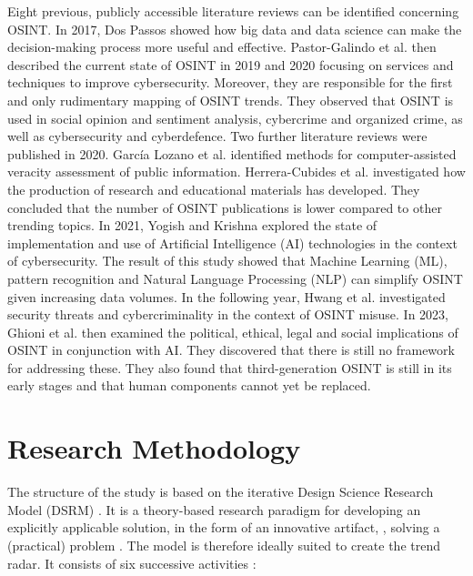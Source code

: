 \documentclass[10pt]{article}
\begin{document}
Eight previous, publicly accessible literature reviews can be identified
concerning OSINT. In 2017, Dos Passos \cite{DosPassos.2017} showed how big data and data science can
make the decision-making process more useful and effective. Pastor-Galindo et al. then described
the current state of OSINT in 2019 \cite{PastorGalindo.2019} and 2020 \cite{PastorGalindo.2020}
focusing on services and techniques to improve cybersecurity. Moreover, they are responsible
for the first and only rudimentary mapping of OSINT trends. They observed that OSINT is used in
social opinion and sentiment analysis, cybercrime and organized crime, as well as cybersecurity and cyberdefence.
Two further literature reviews were published in 2020. García Lozano et al. \cite{GarciaLozano.2020} identified
methods for computer-assisted veracity assessment of public information.
Herrera-Cubides et al. \cite{HerreraCubides.2020} investigated how the production of
research and educational materials has developed. They concluded that
the number of OSINT publications is lower compared to other trending topics. In 2021,
Yogish and Krishna \cite{Yogish.2021} explored the state of implementation and use of
Artificial Intelligence (AI) technologies in the context of cybersecurity. The result of this
study showed that Machine Learning (ML), pattern recognition and Natural Language Processing
(NLP) can simplify OSINT given increasing data volumes. In the following year, Hwang et al.
\cite{Hwang.2022} investigated security threats and cybercriminality in the context of OSINT misuse.
In 2023, Ghioni et al. \cite{Ghioni.2023} then examined the political, ethical, legal and social implications of
OSINT in conjunction with AI. They discovered that there is still no framework
for addressing these. They also found that third-generation OSINT is still in its early
stages and that human components cannot yet be replaced.


\section{Research Methodology}

The structure of the study is based on the iterative Design Science Research Model (DSRM) \cite{Peffers.2007}. It is a theory-based
research paradigm for developing an explicitly applicable solution, in the form of an innovative artifact,
\cite{vomBrocke.2020b}, solving a (practical) problem \cite{Peffers.2007}. The model is therefore ideally suited to
create the trend radar. It consists of six successive activities \cite{Peffers.2007}:
\end{document}
